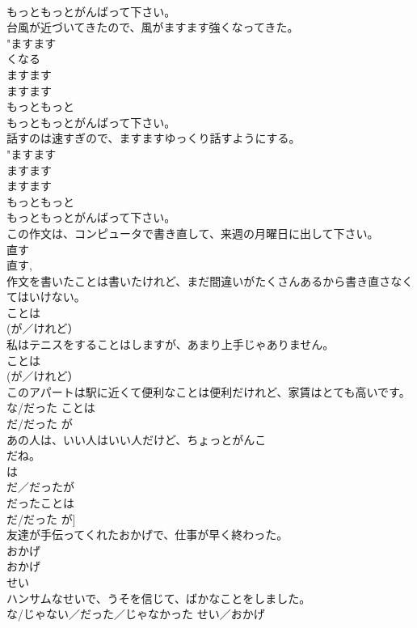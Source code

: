\documentclass[8pt]{extreport}
\begin{document}
\begin{CJK}{UTF8}{min}
{{\\	もっともっとがんばって下さい。
\\	台風が近づいてきたので、風がますます強くなってきた。	
\\	"ますます 
\\	くなる 
\\	ますます 
\\	ますます 
\\	もっともっと 
\\	もっともっとがんばって下さい。
\\	話すのは速すぎので、ますますゆっくり話すようにする。	
\\	"ますます 
\\	ますます 
\\	ますます 
\\	もっともっと 
\\	もっともっとがんばって下さい。
\\	この作文は、コンピュータで書き直して、来週の月曜日に出して下さい。	
\\	直す 
\\	直す, 
\\	作文を書いたことは書いたけれど、まだ間違いがたくさんあるから書き直さなくてはいけない。	
\\	ことは 
\\	(が／けれど） 
\\	私はテニスをすることはしますが、あまり上手じゃありません。	
\\	ことは 
\\	(が／けれど） 
\\	このアパートは駅に近くて便利なことは便利だけれど、家賃はとても高いです。	
\\	{な/だった} ことは 
\\	{だ/だった} が 
\\	あの人は、いい人はいい人だけど、ちょっとがんこ
\\	だね。	
\\	は 
\\	{だ／だった}が 
\\	{だった}ことは 
\\	{だ/だった} が] 
\\	友達が手伝ってくれたおかげで、仕事が早く終わった。	
\\	おかげ 
\\	おかげ 
\\	せい 
\\	ハンサムなせいで、うそを信じて、ばかなことをしました。	
\\	{な/じゃない／だった／じゃなかった} せい／おかげ 
}}
\end{CJK}
\end{document}
